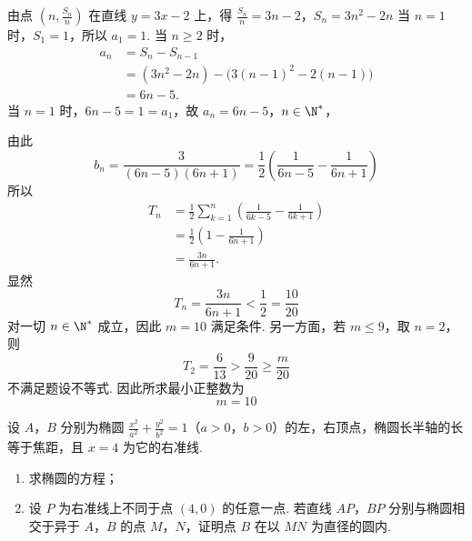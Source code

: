 \begin{solution}
由点 \(\left(n,\frac{S_n}{n}\right)\) 在直线 \(y=3x-2\) 上，得
\(\frac{S_n}{n}=3n-2\)，\(S_n=3n^2-2n\)
当 \(n=1\) 时，\(S_1=1\)，所以 \(a_1=1\). 当 \(n\geqslant2\) 时，
\[
\begin{aligned}
a_n
&=S_n-S_{n-1}\\
&=(3n^2-2n)-\bigl(3(n-1)^2-2(n-1)\bigr)\\
&=6n-5.
\end{aligned}
\]
当 \(n=1\) 时，\(6n-5=1=a_1\)，故
\(a_n=6n-5\)，\(n\in\N^{*}\)，

由此
\[
b_n=\frac{3}{(6n-5)(6n+1)}
=\frac12\left(\frac1{6n-5}-\frac1{6n+1}\right)
\]
所以
\[
\begin{aligned}
T_n
&=\frac12\sum_{k=1}^{n}\left(\frac1{6k-5}-\frac1{6k+1}\right)\\
&=\frac12\left(1-\frac1{6n+1}\right)\\
&=\frac{3n}{6n+1}.
\end{aligned}
\]
显然
\[
T_n=\frac{3n}{6n+1}<\frac12=\frac{10}{20}
\]
对一切 \(n\in\N^{*}\) 成立，因此 \(m=10\) 满足条件. 另一方面，若 \(m\leqslant9\)，取 \(n=2\)，则
\[
T_2=\frac6{13}>\frac9{20}\geqslant\frac m{20}
\]
不满足题设不等式. 因此所求最小正整数为
\[
m=10
\]
\end{solution}

\begin{problem}
设 \(A\)，\(B\) 分别为椭圆 \(\frac{x^2}{a^2} + \frac{y^2}{b^2} = 1\)（\(a > 0\)，\(b > 0\)）的左，右顶点，椭圆长半轴的长等于焦距，且 \(x = 4\) 为它的右准线.

\begin{enumerate}
\item 求椭圆的方程；
\item 设 \(P\) 为右准线上不同于点 \((4,0)\) 的任意一点. 若直线 \(AP\)，\(BP\) 分别与椭圆相交于异于 \(A\)，\(B\) 的点 \(M\)，\(N\)，证明点 \(B\) 在以 \(MN\) 为直径的圆内.
\end{enumerate}
\end{problem}

